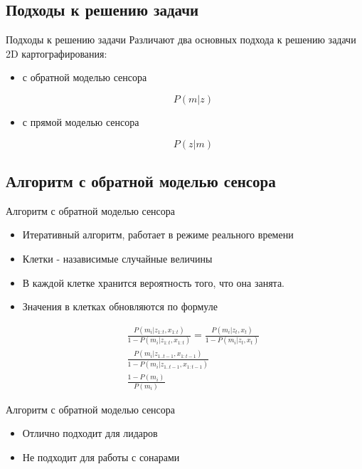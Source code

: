 \documentclass[9pt]{beamer}
\begin{document}
\subsection{Подходы к решению задачи}

\begin{frame}{Подходы к решению задачи}
Различают два основных подхода к решению задачи 2D картографирования:
\begin{itemize}
  \item
  {
    с обратной моделью сенсора

    $$P(m|z)$$
  }
  \item
  {
    с прямой моделью сенсора

    $$P(z|m)$$
  }
\end{itemize}

\end{frame}

\subsection{Алгоритм с обратной моделью сенсора}

\begin{frame}{Алгоритм с обратной моделью сенсора}

\begin{itemize}
  \item
  {
    Итеративный алгоритм, работает в режиме реального времени
  }
  \item
  {
    Клетки - назависимые случайные величины
  }
  \item
  {
    В каждой клетке хранится вероятность того, что она занята.
  }
  \item
  {
    Значения в клетках обновляются по формуле

    \begin{equation}
      \begin{split}
        \frac{P(m_i | z_{1:t}, x_{1:t})}{1 - P(m_i | z_{1:t}, x_{1:t})} = 
        \frac{P(m_i | z_t, x_t)}{1- P(m_i | z_t, x_t)}\\
        \frac{P(m_i | z_{1..t-1}, x_{1:t-1})}{1- P(m_i | z_{1..t-1}, x_{1:t-1})}\\
        \frac{1 - P(m_i)}{P(m_{i})}
      \end{split}
    \end{equation}
  }
\end{itemize}
\end{frame}

\begin{frame}{Алгоритм с обратной моделью сенсора}

\begin{itemize}
  \item
  {
    Отлично подходит для лидаров
  }
  \item
  {
    Не подходит для работы с сонарами
  }
\end{itemize}
\end{frame}
\end{document}
